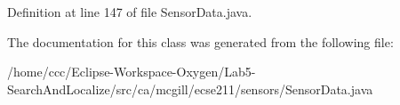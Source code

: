Definition at line 147 of file Sensor\+Data.\+java.



The documentation for this class was generated from the following file\+:\begin{DoxyCompactItemize}
\item 
/home/ccc/\+Eclipse-\/\+Workspace-\/\+Oxygen/\+Lab5-\/\+Search\+And\+Localize/src/ca/mcgill/ecse211/sensors/Sensor\+Data.\+java\end{DoxyCompactItemize}
